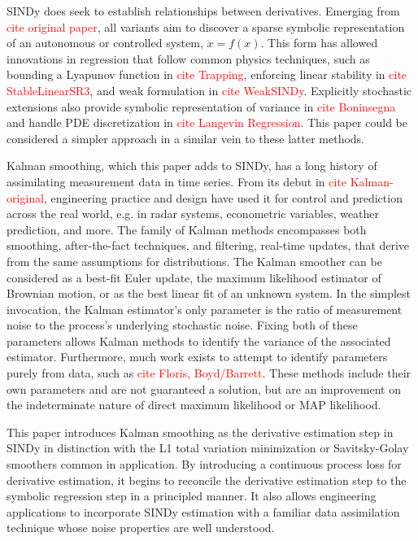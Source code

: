 \documentclass{article}
\newcommand{\red}[1]{\textcolor{red}{#1}}
\begin{document}
SINDy does seek to establish relationships between derivatives. Emerging from \red{cite original paper}, all variants aim to discover a sparse symbolic representation of an autonomous or controlled system, $\dot x = f(x)$.  This form has allowed innovations in regression that follow common physics techniques, such as bounding a Lyapunov function in \red{cite Trapping}, enforcing linear stability in \red{cite StableLinearSR3}, and weak formulation in \red{cite WeakSINDy}.  Explicitly stochastic extensions also provide symbolic representation of variance in \red{cite Boninsegna} and handle PDE discretization in \red{cite Langevin Regression}.  This paper could be considered a simpler approach in a similar vein to these latter methods.

Kalman smoothing, which this paper adds to SINDy, has a long history of assimilating measurement data in time series.  From its debut in \red{cite Kalman-original}, engineering practice and design have used it for control and prediction across the real world, e.g. in radar systems, econometric variables, weather prediction, and more.  The family of Kalman methods encompasses both smoothing, after-the-fact techniques, and filtering, real-time updates, that derive from the same assumptions for distributions.  The Kalman smoother can be considered as a best-fit Euler update, the maximum likelihood estimator of Brownian motion, or as the best linear fit of an unknown system.  In the simplest invocation, the Kalman estimator's only parameter is the ratio of measurement noise to the process's underlying stochastic noise.  Fixing both of these parameters allows Kalman methods to identify the variance of the associated estimator.  Furthermore, much work exists to attempt to identify parameters purely from data, such as \red{cite Floris, Boyd/Barrett}.  These methods include their own parameters and are not guaranteed a solution, but are an improvement on the indeterminate nature of direct maximum likelihood or MAP likelihood.

This paper introduces Kalman smoothing as the derivative estimation step in SINDy in distinction with the L1 total variation minimization or Savitsky-Golay smoothers common in application. By introducing a continuous process loss for derivative estimation, it begins to reconcile the derivative estimation step to the symbolic regression step in a principled manner.  It also allows engineering applications to incorporate SINDy estimation with a familiar data assimilation technique whose noise properties are well understood.
\end{document}
